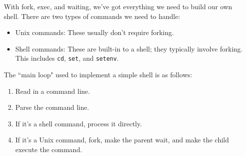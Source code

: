 With fork, exec, and waiting, we've got everything we need to build our own shell. There are two types of commands we need to handle: \begin{itemize}
    \item Unix commands: These usually don't require forking.
    \item Shell commands: These are built-in to a shell; they typically involve forking. This includes \verb!cd!, \verb!set!, and \verb!setenv!.
\end{itemize}

The ``main loop" used to implement a simple shell is as follows: \begin{enumerate}
    \item Read in a command line.
    \item Parse the command line.
    \item If it's a shell command, process it directly.
    \item If it's a Unix command, fork, make the parent wait, and make the child execute the command. 
\end{enumerate} 